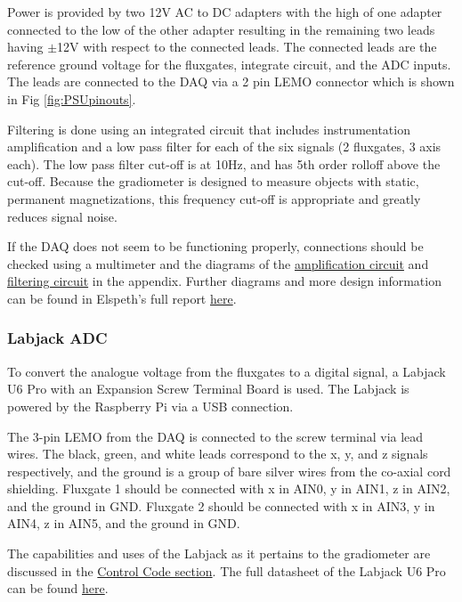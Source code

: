\documentclass{TheMartianReport}
\begin{document}
 Power is provided by two 12V AC to DC adapters with the high of one adapter connected to the low of the other adapter resulting in the remaining two leads having $\pm$12V with respect to the connected leads. The connected leads are the reference ground voltage for the fluxgates, integrate circuit, and the ADC inputs. The leads are connected to the DAQ via a 2 pin LEMO connector which is shown in Fig \ref{fig:PSUpinouts}.

Filtering is done using an integrated circuit that includes instrumentation amplification and a low pass filter for each of the six signals (2 fluxgates, 3 axis each). The low pass filter cut-off is at 10Hz, and has 5th order rolloff above the cut-off. Because the gradiometer is designed to measure objects with static, permanent magnetizations, this frequency cut-off is appropriate and greatly reduces signal noise.

If the DAQ does not seem to be functioning properly, connections should be checked using a multimeter and the diagrams of the \hyperref[fig:PSUamp]{amplification circuit} and \hyperref[fig:PSUfilter]{filtering circuit} in the appendix. Further diagrams and more design information can be found in Elspeth's full report \href{https://ucn.triumf.ca/edm/magnetic-shielding/fluxgates-and-daq/design-implementation-meson-2.pdf/view}{here}.

\subsubsection{Labjack ADC}
To convert the analogue voltage from the fluxgates to a digital signal, a Labjack U6 Pro with an Expansion Screw Terminal Board is used. The Labjack is powered by the Raspberry Pi via a USB connection.

The 3-pin LEMO from the DAQ is connected to the screw terminal via lead wires. The black, green, and white leads correspond to the x, y, and z signals respectively, and the ground is a group of bare silver wires from the co-axial cord shielding. Fluxgate 1 should be connected with x in AIN0, y in AIN1, z in AIN2, and the ground in GND. Fluxgate 2 should be connected with x in AIN3, y in AIN4, z in AIN5, and the ground in GND.

The capabilities and uses of the Labjack as it pertains to the gradiometer are discussed in the \hyperref[sec:ControlCode]{Control Code section}. The full datasheet of the Labjack U6 Pro can be found \href{https://labjack.com/support/datasheets/u6}{here}.
\end{document}

